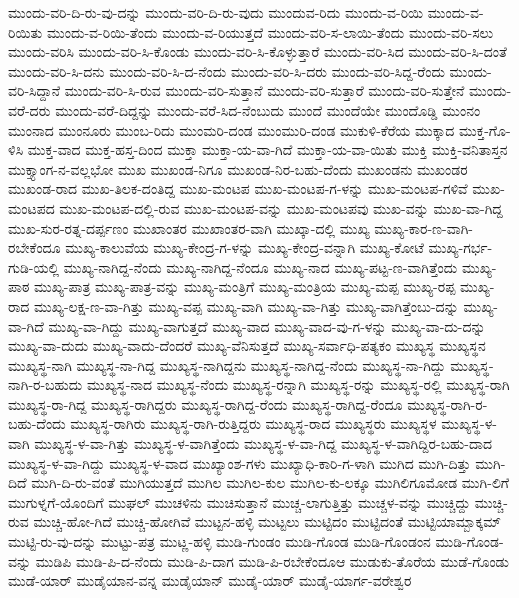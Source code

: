 ಮುಂದು-ವರಿ-ದಿ-ರು-ವು-ದನ್ನು
ಮುಂದು-ವರಿ-ದಿ-ರು-ವುದು
ಮುಂದುವ-ರಿದು
ಮುಂದು-ವ-ರಿಯಿ
ಮುಂದು-ವ-ರಿಯಿತು
ಮುಂದು-ವ-ರಿಯಿ-ತೆಂದು
ಮುಂದು-ವ-ರಿಯುತ್ತದೆ
ಮುಂದು-ವರಿ-ಸ-ಲಾಯಿ-ತೆಂದು
ಮುಂದು-ವರಿ-ಸಲು
ಮುಂದು-ವರಿಸಿ
ಮುಂದು-ವರಿ-ಸಿ-ಕೊಂಡು
ಮುಂದು-ವರಿ-ಸಿ-ಕೊಳ್ಳುತ್ತಾರೆ
ಮುಂದು-ವರಿ-ಸಿದ
ಮುಂದು-ವರಿ-ಸಿ-ದಂತೆ
ಮುಂದು-ವರಿ-ಸಿ-ದನು
ಮುಂದು-ವರಿ-ಸಿ-ದ-ನೆಂದು
ಮುಂದು-ವರಿ-ಸಿ-ದರು
ಮುಂದು-ವರಿ-ಸಿದ್ದ-ರೆಂದು
ಮುಂದು-ವರಿ-ಸಿದ್ದಾನೆ
ಮುಂದು-ವರಿ-ಸಿ-ರುವ
ಮುಂದು-ವರಿ-ಸುತ್ತಾನೆ
ಮುಂದು-ವರಿ-ಸುತ್ತಾರೆ
ಮುಂದು-ವರಿ-ಸುತ್ತೇನೆ
ಮುಂದು-ವರೆ-ದರು
ಮುಂದು-ವರೆ-ದಿದ್ದನ್ನು
ಮುಂದು-ವರೆ-ಸಿದ-ನೆಂಬುದು
ಮುಂದೆ
ಮುಂದೆಯೇ
ಮುಂದೊಡ್ಡಿ
ಮುಂನಂ
ಮುಂನಾದ
ಮುಂನೂರು
ಮುಂಬ-ರಿದು
ಮುಂಮರಿ-ದಂಡ
ಮುಂಮುರಿ-ದಂಡ
ಮುಕುಳಿ-ಕೆರೆಯ
ಮುಕ್ಕಾದ
ಮುಕ್ತ-ಗೊ-ಳಿಸಿ
ಮುಕ್ತ-ವಾದ
ಮುಕ್ತ-ಹಸ್ತ-ದಿಂದ
ಮುಕ್ತಾ
ಮುಕ್ತಾ-ಯ-ವಾ-ಗಿದೆ
ಮುಕ್ತಾ-ಯ-ವಾ-ಯಿತು
ಮುಕ್ತಿ
ಮುಕ್ತಿ-ವನಿತಾಸ್ತನ
ಮುಕ್ತ್ಯಾಂಗ-ನ-ವಲ್ಲಭೋ
ಮುಖ
ಮುಖಂಡ-ನಿಗೂ
ಮುಖಂಡ-ನಿರ-ಬಹು-ದೆಂದು
ಮುಖಂಡನು
ಮುಖಂಡರ
ಮುಖಂಡ-ರಾದ
ಮುಖ-ತಿಲಕ-ದಂತಿದ್ದ
ಮುಖ-ಮಂಟಪ
ಮುಖ-ಮಂಟಪ-ಗ-ಳನ್ನು
ಮುಖ-ಮಂಟಪ-ಗಳಿವೆ
ಮುಖ-ಮಂಟಪದ
ಮುಖ-ಮಂಟಪ-ದಲ್ಲಿ-ರುವ
ಮುಖ-ಮಂಟಪ-ವನ್ನು
ಮುಖ-ಮಂಟಪವು
ಮುಖ-ವನ್ನು
ಮುಖ-ವಾ-ಗಿದ್ದ
ಮುಖ-ಸುರ-ರತ್ನ-ದರ್ಪ್ಪಣಂ
ಮುಖಾಂತರ
ಮುಖಾಂತರ-ವಾಗಿ
ಮುಖ್ಕಾ-ದಲ್ಲಿ
ಮುಖ್ಯ
ಮುಖ್ಯ-ಕಾರ-ಣ-ವಾಗಿ-ರಬೇಕೆಂದೂ
ಮುಖ್ಯ-ಕಾಲುವೆಯ
ಮುಖ್ಯ-ಕೇಂದ್ರ-ಗ-ಳನ್ನು
ಮುಖ್ಯ-ಕೇಂದ್ರ-ವನ್ನಾಗಿ
ಮುಖ್ಯ-ಕೋಟೆ
ಮುಖ್ಯ-ಗರ್ಭ-ಗುಡಿ-ಯಲ್ಲಿ
ಮುಖ್ಯ-ನಾಗಿದ್ದ-ನೆಂದು
ಮುಖ್ಯ-ನಾಗಿದ್ದ-ನೆಂದೂ
ಮುಖ್ಯ-ನಾದ
ಮುಖ್ಯ-ಪಟ್ಟ-ಣ-ವಾಗಿತ್ತೆಂದು
ಮುಖ್ಯ-ಪಾಠ
ಮುಖ್ಯ-ಪಾತ್ರ
ಮುಖ್ಯ-ಪಾತ್ರ-ವನ್ನು
ಮುಖ್ಯ-ಮಂತ್ರಿಗೆ
ಮುಖ್ಯ-ಮಂತ್ರಿಯ
ಮುಖ್ಯ-ಮಪ್ಪ
ಮುಖ್ಯ-ರಪ್ಪ
ಮುಖ್ಯ-ರಾದ
ಮುಖ್ಯ-ಲಕ್ಷ-ಣ-ವಾ-ಗಿತ್ತು
ಮುಖ್ಯ-ವಪ್ಪ
ಮುಖ್ಯ-ವಾಗಿ
ಮುಖ್ಯ-ವಾ-ಗಿತ್ತು
ಮುಖ್ಯ-ವಾಗಿತ್ತೆಂಬು-ದನ್ನು
ಮುಖ್ಯ-ವಾ-ಗಿದೆ
ಮುಖ್ಯ-ವಾ-ಗಿದ್ದು
ಮುಖ್ಯ-ವಾಗುತ್ತದೆ
ಮುಖ್ಯ-ವಾದ
ಮುಖ್ಯ-ವಾದ-ವು-ಗ-ಳನ್ನು
ಮುಖ್ಯ-ವಾ-ದು-ದನ್ನು
ಮುಖ್ಯ-ವಾ-ದುದು
ಮುಖ್ಯ-ವಾದು-ದೆಂದರೆ
ಮುಖ್ಯ-ವೆನಿಸುತ್ತದೆ
ಮುಖ್ಯ-ಸರ್ವಾಧಿ-ಪತ್ಯಕಂ
ಮುಖ್ಯಸ್ಥ
ಮುಖ್ಯಸ್ಥನ
ಮುಖ್ಯಸ್ಥ-ನಾಗಿ
ಮುಖ್ಯಸ್ಥ-ನಾ-ಗಿದ್ದ
ಮುಖ್ಯಸ್ಥ-ನಾಗಿದ್ದನು
ಮುಖ್ಯಸ್ಥ-ನಾಗಿದ್ದ-ನೆಂದು
ಮುಖ್ಯಸ್ಥ-ನಾ-ಗಿದ್ದು
ಮುಖ್ಯಸ್ಥ-ನಾಗಿ-ರ-ಬಹುದು
ಮುಖ್ಯಸ್ಥ-ನಾದ
ಮುಖ್ಯಸ್ಥ-ನೆಂದು
ಮುಖ್ಯಸ್ಥ-ರನ್ನಾಗಿ
ಮುಖ್ಯಸ್ಥ-ರನ್ನು
ಮುಖ್ಯಸ್ಥ-ರಲ್ಲಿ
ಮುಖ್ಯಸ್ಥ-ರಾಗಿ
ಮುಖ್ಯಸ್ಥ-ರಾ-ಗಿದ್ದ
ಮುಖ್ಯಸ್ಥ-ರಾಗಿದ್ದರು
ಮುಖ್ಯಸ್ಥ-ರಾಗಿದ್ದ-ರೆಂದು
ಮುಖ್ಯಸ್ಥ-ರಾಗಿದ್ದ-ರೆಂದೂ
ಮುಖ್ಯಸ್ಥ-ರಾಗಿ-ರ-ಬಹು-ದೆಂದು
ಮುಖ್ಯಸ್ಥ-ರಾಗಿರು
ಮುಖ್ಯಸ್ಥ-ರಾಗಿ-ರುತ್ತಿದ್ದರು
ಮುಖ್ಯಸ್ಥ-ರಾದ
ಮುಖ್ಯಸ್ಥರು
ಮುಖ್ಯಸ್ಥಳ
ಮುಖ್ಯಸ್ಥ-ಳ-ವಾಗಿ
ಮುಖ್ಯಸ್ಥ-ಳ-ವಾ-ಗಿತ್ತು
ಮುಖ್ಯಸ್ಥ-ಳ-ವಾಗಿತ್ತೆಂದು
ಮುಖ್ಯಸ್ಥ-ಳ-ವಾ-ಗಿದ್ದ
ಮುಖ್ಯಸ್ಥ-ಳ-ವಾಗಿದ್ದಿರ-ಬಹು-ದಾದ
ಮುಖ್ಯಸ್ಥ-ಳ-ವಾ-ಗಿದ್ದು
ಮುಖ್ಯಸ್ಥ-ಳ-ವಾದ
ಮುಖ್ಯಾಂಶ-ಗಳು
ಮುಖ್ಯಾಧಿ-ಕಾರಿ-ಗ-ಳಾಗಿ
ಮುಗಿದ
ಮುಗಿ-ದಿತ್ತು
ಮುಗಿ-ದಿದೆ
ಮುಗಿ-ದಿ-ರು-ವಂತೆ
ಮುಗಿಯುತ್ತದೆ
ಮುಗಿಲ
ಮುಗಿಲ-ಕುಲ
ಮುಗಿಲ-ಕು-ಲಕ್ಕೂ
ಮುಗಿಲಿಗೂಮೋಡ
ಮುಗಿ-ಲಿಗೆ
ಮುಗುಳ್ನಗೆ-ಯೊಂದಿಗೆ
ಮುಘಲ್
ಮುಚಳಿನು
ಮುಚಿಸುತ್ತಾನೆ
ಮುಚ್ಚ-ಲಾಗುತ್ತಿತ್ತು
ಮುಚ್ಚಳ-ವನ್ನು
ಮುಚ್ಚಿದ್ದು
ಮುಚ್ಚಿ-ರುವ
ಮುಚ್ಚಿ-ಹೋ-ಗಿದೆ
ಮುಚ್ಚಿ-ಹೋಗಿವೆ
ಮುಟ್ಟನ-ಹಳ್ಳಿ
ಮುಟ್ಟಲು
ಮುಟ್ಟಿದಂ
ಮುಟ್ಟಿದಂತೆ
ಮುಟ್ಟಿಯಾಮ್ಬಾಕ್ಕಮ್
ಮುಟ್ಟಿ-ರು-ವು-ದನ್ನು
ಮುಟ್ಟು-ಪತ್ರ
ಮುಟ್ಣ-ಹಳ್ಳಿ
ಮುಡಿ-ಗುಂಡಂ
ಮುಡಿ-ಗೊಂಡ
ಮುಡಿ-ಗೊಂಡಂನ
ಮುಡಿ-ಗೊಂಡ-ವನ್ನು
ಮುಡಿಪಿ
ಮುಡಿ-ಪಿ-ದ-ನೆಂದು
ಮುಡಿ-ಪಿ-ದಾಗ
ಮುಡಿ-ಪಿ-ರಬೇಕೆಂದೂಆ
ಮುಡುಕು-ತೊರೆಯ
ಮುಡೆ-ಗೊಂಡು
ಮುಡೆ-ಯಾರ್
ಮುಡೈಯಾನ-ವನ್ನ
ಮುಡೈಯಾನ್
ಮುಡೈ-ಯಾರ್
ಮುಡೈ-ಯಾರ್ಗ-ವರೇಶ್ವರ
